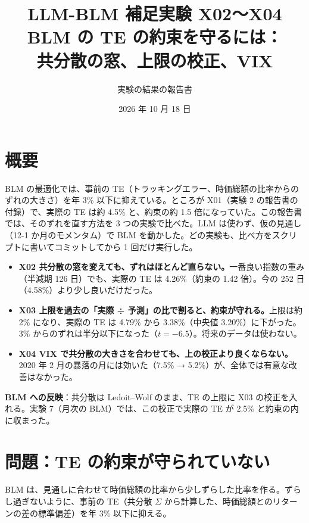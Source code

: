 \documentclass[xelatex,ja=standard,jafont=haranoaji,a4paper,10pt,openany]{bxjsreport}
\title{LLM-BLM 補足実験 X02〜X04\\[6pt]
  \large BLM の TE の約束を守るには：\\共分散の窓、上限の校正、VIX}
\author{実験の結果の報告書}
\date{2026 年 10 月 18 日}
\begin{document}
\maketitle

\chapter*{概要}

BLM の最適化では、事前の TE（トラッキングエラー、時価総額の比率からのずれの大きさ）を年 3\% 以下に抑えている。ところが X01（実験 2 の報告書の付録）で、実際の TE は約 4.5\% と、約束の約 1.5 倍になっていた。この報告書では、そのずれを直す方法を 3 つの実験で比べた。LLM は使わず、仮の見通し（12-1 か月のモメンタム）で BLM を動かした。どの実験も、比べ方をスクリプトに書いてコミットしてから 1 回だけ実行した。

\begin{keybox}[主な結論]
\begin{itemize}
\item \textbf{X02 共分散の窓を変えても、ずれはほとんど直らない。}一番良い指数の重み（半減期 126 日）でも、実際の TE は 4.26\%（約束の 1.42 倍）。今の 252 日（4.58\%）より少し良いだけだった。
\item \textbf{X03 上限を過去の「実際 ÷ 予測」の比で割ると、約束が守れる。}上限は約 2\% になり、実際の TE は 4.79\% から 3.38\%（中央値 3.20\%）に下がった。3\% からのずれは半分以下になった（$t=-6.5$）。将来のデータは使わない。
\item \textbf{X04 VIX で共分散の大きさを合わせても、上の校正より良くならない。}2020 年 2 月の暴落の月には効いた（7.5\% → 5.2\%）が、全体では有意な改善はなかった。
\end{itemize}
\end{keybox}

\textbf{BLM への反映}：共分散は Ledoit--Wolf のまま、TE の上限に X03 の校正を入れる。実験 7（月次の BLM）では、この校正で実際の TE が 2.5\% と約束の内に収まった。

\setcounter{tocdepth}{1}
{\small\tableofcontents}

\chapter{問題：TE の約束が守られていない}\label{ch:intro}

BLM は、見通しに合わせて時価総額の比率から少しずらした比率を作る。ずらし過ぎないように、事前の TE（共分散 $\Sigma$ から計算した、時価総額とのリターンの差の標準偏差）を年 3\% 以下に抑える。
\end{document}
